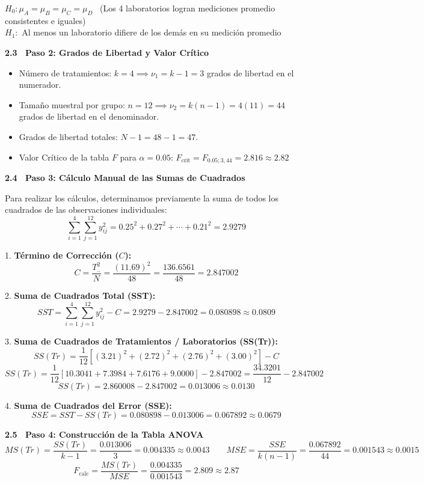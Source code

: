 \documentclass[10pt,a4paper]{article}
\begin{document}
$H_0: \mu_A=\mu_B=\mu_C=\mu_D$ \ (Los 4 laboratorios logran mediciones promedio consistentes e iguales)\\
$H_1:$ Al menos un laboratorio difiere de los demás en su medición promedio

\textbf{2.3 \ Paso 2: Grados de Libertad y Valor Crítico}
\begin{itemize}[leftmargin=16pt,itemsep=1pt,topsep=1pt,parsep=0pt]
  \item Número de tratamientos: $k=4 \implies \nu_1 = k-1 = 3$ grados de libertad en el numerador.
  \item Tamaño muestral por grupo: $n=12 \implies \nu_2 = k(n-1) = 4(11) = 44$ grados de libertad en el denominador.
  \item Grados de libertad totales: $N-1 = 48-1 = 47$.
  \item Valor Crítico de la tabla $F$ para $\alpha=0.05$: \quad $F_{\text{crit}} = F_{0.05;3,44} = 2.816 \approx 2.82$
\end{itemize}

\textbf{2.4 \ Paso 3: Cálculo Manual de las Sumas de Cuadrados}

Para realizar los cálculos, determinamos previamente la suma de todos los cuadrados de las observaciones individuales:
\[
\sum_{i=1}^{4}\sum_{j=1}^{12} y_{ij}^2 = 0.25^2+0.27^2+\cdots+0.21^2 = 2.9279
\]

1. \textbf{Término de Corrección ($C$):}
\[
C = \frac{T_{..}^2}{N} = \frac{(11.69)^2}{48} = \frac{136.6561}{48} = 2.847002
\]

2. \textbf{Suma de Cuadrados Total (SST):}
\[
SST = \sum_{i=1}^{4}\sum_{j=1}^{12} y_{ij}^2 - C = 2.9279 - 2.847002 = \mathbf{0.080898} \approx 0.0809
\]

3. \textbf{Suma de Cuadrados de Tratamientos / Laboratorios (SS(Tr)):}
\[
SS(Tr) = \frac{1}{12}\left[(3.21)^2+(2.72)^2+(2.76)^2+(3.00)^2\right] - C
\]
\[
SS(Tr) = \frac{1}{12}\left[10.3041+7.3984+7.6176+9.0000\right] - 2.847002 = \frac{34.3201}{12} - 2.847002
\]
\[
SS(Tr) = 2.860008 - 2.847002 = \mathbf{0.013006} \approx 0.0130
\]

4. \textbf{Suma de Cuadrados del Error (SSE):}
\[
SSE = SST - SS(Tr) = 0.080898 - 0.013006 = \mathbf{0.067892} \approx 0.0679
\]

\textbf{2.5 \ Paso 4: Construcción de la Tabla ANOVA}
\[
MS(Tr) = \frac{SS(Tr)}{k-1} = \frac{0.013006}{3} = \mathbf{0.004335} \approx 0.0043
\qquad
MSE = \frac{SSE}{k(n-1)} = \frac{0.067892}{44} = \mathbf{0.001543} \approx 0.0015
\]
\[
F_{\text{calc}} = \frac{MS(Tr)}{MSE} = \frac{0.004335}{0.001543} = \mathbf{2.809} \approx \mathbf{2.87}
\]
\end{document}
